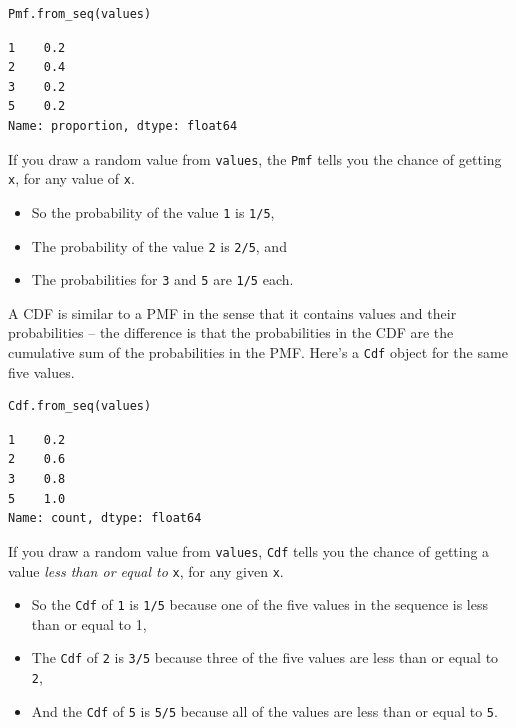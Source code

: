 \begin{lstlisting}[language=Python,style=source]
Pmf.from_seq(values)
\end{lstlisting}

\begin{lstlisting}[style=output]
1    0.2
2    0.4
3    0.2
5    0.2
Name: proportion, dtype: float64
\end{lstlisting}

If you draw a random value from \passthrough{\lstinline!values!}, the
\passthrough{\lstinline!Pmf!} tells you the chance of getting
\passthrough{\lstinline!x!}, for any value of
\passthrough{\lstinline!x!}.

\begin{itemize}
\item
  So the probability of the value \passthrough{\lstinline!1!} is
  \passthrough{\lstinline!1/5!},
\item
  The probability of the value \passthrough{\lstinline!2!} is
  \passthrough{\lstinline!2/5!}, and
\item
  The probabilities for \passthrough{\lstinline!3!} and
  \passthrough{\lstinline!5!} are \passthrough{\lstinline!1/5!} each.
\end{itemize}

A CDF is similar to a PMF in the sense that it contains values and their
probabilities -- the difference is that the probabilities in the CDF are
the cumulative sum of the probabilities in the PMF. Here's a
\passthrough{\lstinline!Cdf!} object for the same five values.

\begin{lstlisting}[language=Python,style=source]
Cdf.from_seq(values)
\end{lstlisting}

\begin{lstlisting}[style=output]
1    0.2
2    0.6
3    0.8
5    1.0
Name: count, dtype: float64
\end{lstlisting}

If you draw a random value from \passthrough{\lstinline!values!},
\passthrough{\lstinline!Cdf!} tells you the chance of getting a value
\emph{less than or equal to} \passthrough{\lstinline!x!}, for any given
\passthrough{\lstinline!x!}.

\begin{itemize}
\item
  So the \passthrough{\lstinline!Cdf!} of \passthrough{\lstinline!1!} is
  \passthrough{\lstinline!1/5!} because one of the five values in the
  sequence is less than or equal to 1,
\item
  The \passthrough{\lstinline!Cdf!} of \passthrough{\lstinline!2!} is
  \passthrough{\lstinline!3/5!} because three of the five values are
  less than or equal to \passthrough{\lstinline!2!},
\item
  And the \passthrough{\lstinline!Cdf!} of \passthrough{\lstinline!5!}
  is \passthrough{\lstinline!5/5!} because all of the values are less
  than or equal to \passthrough{\lstinline!5!}.
\end{itemize}

